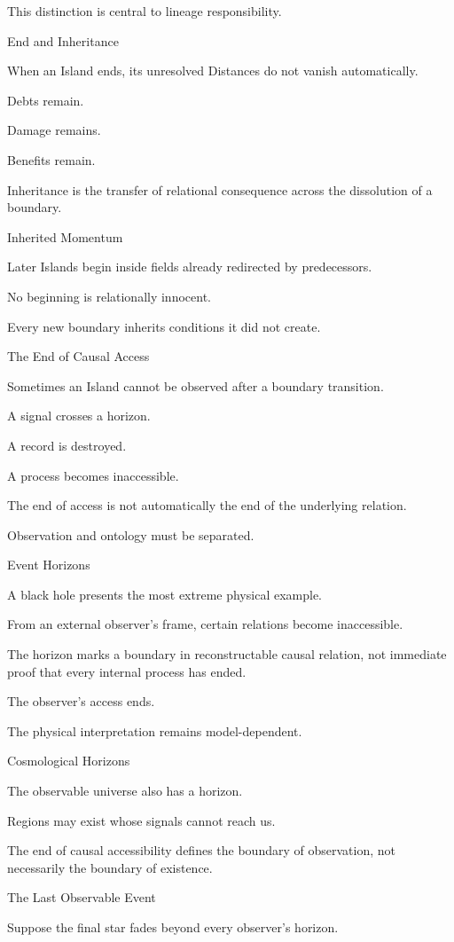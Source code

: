 This distinction is central to lineage responsibility.

End and Inheritance

When an Island ends, its unresolved Distances do not vanish automatically.

Debts remain.

Damage remains.

Benefits remain.

Inheritance is the transfer of relational consequence across the dissolution of a boundary.

Inherited Momentum

Later Islands begin inside fields already redirected by predecessors.

No beginning is relationally innocent.

Every new boundary inherits conditions it did not create.

The End of Causal Access

Sometimes an Island cannot be observed after a boundary transition.

A signal crosses a horizon.

A record is destroyed.

A process becomes inaccessible.

The end of access is not automatically the end of the underlying relation.

Observation and ontology must be separated.

Event Horizons

A black hole presents the most extreme physical example.

From an external observer’s frame, certain relations become inaccessible.

The horizon marks a boundary in reconstructable causal relation, not immediate proof that every internal process has ended.

The observer’s access ends.

The physical interpretation remains model-dependent.

Cosmological Horizons

The observable universe also has a horizon.

Regions may exist whose signals cannot reach us.

The end of causal accessibility defines the boundary of observation, not necessarily the boundary of existence.

The Last Observable Event

Suppose the final star fades beyond every observer’s horizon.

